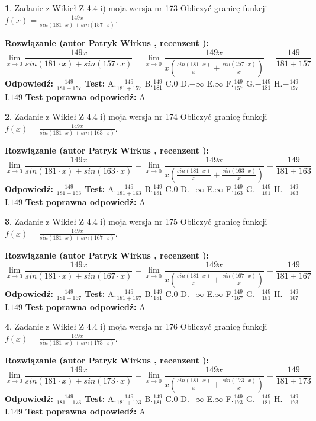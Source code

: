 \documentclass[12pt, a4paper]{article}
\theoremstyle{definition} %
\newtheorem{zad}{}
\newcommand{\zadStart}[1]{\begin{zad}#1\newline}
\newcommand{\zadStop}{\end{zad}}
\newcommand{\rozwStart}[2]{\noindent \textbf{Rozwiązanie (autor #1 , recenzent #2): }\newline}
\newcommand{\rozwStop}{\newline}
\newcommand{\odpStart}{\noindent \textbf{Odpowiedź:}\newline}
\newcommand{\odpStop}{\newline}
\newcommand{\testStart}{\noindent \textbf{Test:}\newline}
\newcommand{\testStop}{\newline}
\newcommand{\kluczStart}{\noindent \textbf{Test poprawna odpowiedź:}\newline}
\newcommand{\kluczStop}{\newline}
\begin{document}
\zadStart{Zadanie z Wikieł Z 4.4 i) moja wersja nr 173}
Obliczyć granicę funkcji $f(x)=\frac{149x}{sin(181\cdot x) +sin(157\cdot x)}$.
\zadStop
\rozwStart{Patryk Wirkus}{}
$$\lim\limits_{x\to 0}\frac{149x}{sin(181\cdot x) +sin(157\cdot x)}=\lim\limits_{x\to 0}\frac{149x}{x(\frac{sin(181\cdot x)}{x}+\frac{sin(157\cdot x)}{x})}=\frac{149}{181+157}$$
\rozwStop
\odpStart
$\frac{149}{181+157}$
\odpStop
\testStart
A.$\frac{149}{181+157}$
B.$\frac{149}{181}$
C.$0$
D.$-\infty$
E.$\infty$
F.$\frac{149}{157}$
G.$-\frac{149}{181}$
H.$-\frac{149}{157}$
I.$149$
\testStop
\kluczStart
A
\kluczStop



\zadStart{Zadanie z Wikieł Z 4.4 i) moja wersja nr 174}
Obliczyć granicę funkcji $f(x)=\frac{149x}{sin(181\cdot x) +sin(163\cdot x)}$.
\zadStop
\rozwStart{Patryk Wirkus}{}
$$\lim\limits_{x\to 0}\frac{149x}{sin(181\cdot x) +sin(163\cdot x)}=\lim\limits_{x\to 0}\frac{149x}{x(\frac{sin(181\cdot x)}{x}+\frac{sin(163\cdot x)}{x})}=\frac{149}{181+163}$$
\rozwStop
\odpStart
$\frac{149}{181+163}$
\odpStop
\testStart
A.$\frac{149}{181+163}$
B.$\frac{149}{181}$
C.$0$
D.$-\infty$
E.$\infty$
F.$\frac{149}{163}$
G.$-\frac{149}{181}$
H.$-\frac{149}{163}$
I.$149$
\testStop
\kluczStart
A
\kluczStop



\zadStart{Zadanie z Wikieł Z 4.4 i) moja wersja nr 175}
Obliczyć granicę funkcji $f(x)=\frac{149x}{sin(181\cdot x) +sin(167\cdot x)}$.
\zadStop
\rozwStart{Patryk Wirkus}{}
$$\lim\limits_{x\to 0}\frac{149x}{sin(181\cdot x) +sin(167\cdot x)}=\lim\limits_{x\to 0}\frac{149x}{x(\frac{sin(181\cdot x)}{x}+\frac{sin(167\cdot x)}{x})}=\frac{149}{181+167}$$
\rozwStop
\odpStart
$\frac{149}{181+167}$
\odpStop
\testStart
A.$\frac{149}{181+167}$
B.$\frac{149}{181}$
C.$0$
D.$-\infty$
E.$\infty$
F.$\frac{149}{167}$
G.$-\frac{149}{181}$
H.$-\frac{149}{167}$
I.$149$
\testStop
\kluczStart
A
\kluczStop



\zadStart{Zadanie z Wikieł Z 4.4 i) moja wersja nr 176}
Obliczyć granicę funkcji $f(x)=\frac{149x}{sin(181\cdot x) +sin(173\cdot x)}$.
\zadStop
\rozwStart{Patryk Wirkus}{}
$$\lim\limits_{x\to 0}\frac{149x}{sin(181\cdot x) +sin(173\cdot x)}=\lim\limits_{x\to 0}\frac{149x}{x(\frac{sin(181\cdot x)}{x}+\frac{sin(173\cdot x)}{x})}=\frac{149}{181+173}$$
\rozwStop
\odpStart
$\frac{149}{181+173}$
\odpStop
\testStart
A.$\frac{149}{181+173}$
B.$\frac{149}{181}$
C.$0$
D.$-\infty$
E.$\infty$
F.$\frac{149}{173}$
G.$-\frac{149}{181}$
H.$-\frac{149}{173}$
I.$149$
\testStop
\kluczStart
A
\kluczStop
\end{document}
